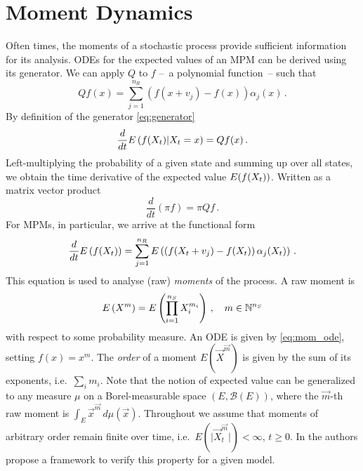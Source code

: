 \section{Moment Dynamics}\label{sec:moments_bg}
Often times, the moments of a stochastic process provide sufficient information for its analysis.
\acp{ODE} for the expected values of an \ac{MPM} can be derived using its generator.
We can apply $Q$ to $f$ --~a polynomial function~-- such that
\begin{equation}\label{eq:Qf}
	Qf(x) = \sum_{j=1}^{n_R}\left(f(x+v_j) - f(x)\right)\alpha_j(x)\,.
\end{equation}
By definition of the generator \eqref{eq:generator}
\[
	\frac{d}{dt}{E}\left(f(X_t)|X_t=x\right) = Qf(x)\,.
\]
Left-multiplying the probability of a given state and summing up over all states, we
obtain the time derivative of the expected value ${E}(f(X_t))$.
Written as a matrix vector product
\[
	\frac{d}{dt}(\pi f) = \pi Qf\,.
\]
For \acp{MPM}, in particular, we arrive at the functional form
\begin{equation}\label{eq:mom_ode}
	\frac{d}{dt}{E}\left(f({X}_t)\right) = \sum_{j=1}^{n_R}{E}\left(\left(f({X_t +
	v_j}) - f(X_t)\right)\alpha_j(X_t)\right)\,.
\end{equation}
This equation is used to analyse (raw) \emph{moments} of the process.
A raw moment is
\[{E}\left(X^{m}\right)={E}\left(\prod_{i=1}^{n_S} X_i^{m_i}\right)\,,\quad m\in {\mathbb{N}}^{n_S}\]
with respect to some probability measure.
An \ac{ODE} is given by \eqref{eq:mom_ode}, setting $f(x)=x^m$.
The \emph{order} of a moment $E({\vec X}^{\vec m})$ is given by the sum of its exponents,
i.e.\ $\sum_i m_i$.
Note that the notion of  expected value can be generalized
to any measure $\mu$ on a Borel-measurable space
$(E, \mathcal{B}(E))$, where
 the $\vec{m}$-th raw moment is $\int_E {\vec x}^{\vec m}\,d\mu(\vec x)$.
Throughout we assume that moments of arbitrary order remain finite over time,
i.e.\ $E(\lvert \vec{X}^{\vec{m}}_t\rvert)<\infty$, $t\geq 0$.
In \citet{gupta2014scalable} the authors propose a framework to verify
this property for a given model.

